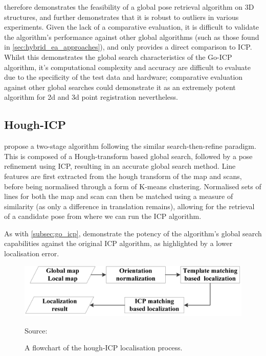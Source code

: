 \documentclass[authoryearcitations]{UoYCSproject}
\begin{document}
\citeauthor{Yang2013-gx} therefore demonstrates the feasibility of a global pose retrieval algorithm on 3D structures, and further demonstrates that it is robust to outliers in various experiments. Given the lack of a comparative evaluation, it is difficult to validate the algorithm's performance against other global algorithms (such as those found in \autoref{sec:hybrid_ea_approaches}), and \citeauthor{Yang2013-gx} only provides a direct comparison to ICP. Whilst this demonstrates the global search characteristics of the Go-ICP algorithm, it's computational complexity and accuracy are difficult to evaluate due to the specificity of the test data and hardware; comparative evaluation against other global searches could demonstrate it as an extremely potent algorithm for 2d and 3d point registration nevertheless.
 
\subsection{Hough-ICP}
\label{subsec:hough_icp}

\citet{Ma2016-es} propose a two-stage algorithm following the similar search-then-refine paradigm. This is composed of a Hough-transform based global search, followed by a pose refinement using ICP, resulting in an accurate global search method. Line features are first extracted from the hough transform of the map and scans, before being normalised through a form of K-means clustering. Normalised sets of lines for both the map and scan can then be matched using a measure of similarity (as only a difference in translation remains), allowing for the retrieval of a candidate pose from where we can run the ICP algorithm. \newline

As with \autoref{subsec:go_icp}, \citeauthor{Ma2016-es} demonstrate the potency of the algorithm's global search capabilities against the original ICP algorithm, as highlighted by a lower localisation error. 

\begin{figure}[ht]
	\centering
	\includegraphics[width=12cm,keepaspectratio]{images/hough_icp.png}
	\caption[Hough-ICP localisation process]{A flowchart of the hough-ICP localisation process.}{Source: \citet{Ma2016-es}}
	\label{fig:hough_icp_flowchart}
\end{figure}
\end{document}
